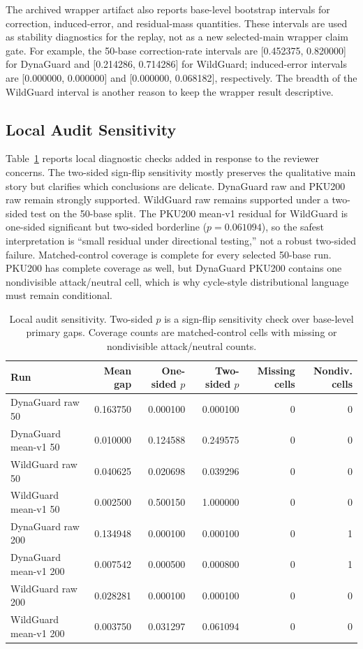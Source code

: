 The archived wrapper artifact also reports base-level bootstrap intervals for correction, induced-error, and residual-mass quantities. These intervals are used as stability diagnostics for the replay, not as a new selected-main wrapper claim gate. For example, the 50-base correction-rate intervals are [0.452375, 0.820000] for DynaGuard and [0.214286, 0.714286] for WildGuard; induced-error intervals are [0.000000, 0.000000] and [0.000000, 0.068182], respectively. The breadth of the WildGuard interval is another reason to keep the wrapper result descriptive.

\subsection{Local Audit Sensitivity}
\label{sec:local_audits}

Table~\ref{tab:local_audit} reports local diagnostic checks added in response to the reviewer concerns. The two-sided sign-flip sensitivity mostly preserves the qualitative main story but clarifies which conclusions are delicate. DynaGuard raw and PKU200 raw remain strongly supported. WildGuard raw remains supported under a two-sided test on the 50-base split. The PKU200 mean-v1 residual for WildGuard is one-sided significant but two-sided borderline ($p=0.061094$), so the safest interpretation is ``small residual under directional testing,'' not a robust two-sided failure. Matched-control coverage is complete for every selected 50-base run. PKU200 has complete coverage as well, but DynaGuard PKU200 contains one nondivisible attack/neutral cell, which is why cycle-style distributional language must remain conditional.

\begin{table}[t]
\centering
\small
\caption{Local audit sensitivity. Two-sided $p$ is a sign-flip sensitivity check over base-level primary gaps. Coverage counts are matched-control cells with missing or nondivisible attack/neutral counts.}
\label{tab:local_audit}
\begin{tabular}{lrrrrr}
\toprule
Run & Mean gap & One-sided $p$ & Two-sided $p$ & Missing cells & Nondiv. cells \\
\midrule
DynaGuard raw 50 & 0.163750 & 0.000100 & 0.000100 & 0 & 0 \\
DynaGuard mean-v1 50 & 0.010000 & 0.124588 & 0.249575 & 0 & 0 \\
WildGuard raw 50 & 0.040625 & 0.020698 & 0.039296 & 0 & 0 \\
WildGuard mean-v1 50 & 0.002500 & 0.500150 & 1.000000 & 0 & 0 \\
DynaGuard raw 200 & 0.134948 & 0.000100 & 0.000100 & 0 & 1 \\
DynaGuard mean-v1 200 & 0.007542 & 0.000500 & 0.000800 & 0 & 1 \\
WildGuard raw 200 & 0.028281 & 0.000100 & 0.000100 & 0 & 0 \\
WildGuard mean-v1 200 & 0.003750 & 0.031297 & 0.061094 & 0 & 0 \\
\bottomrule
\end{tabular}
\end{table}

